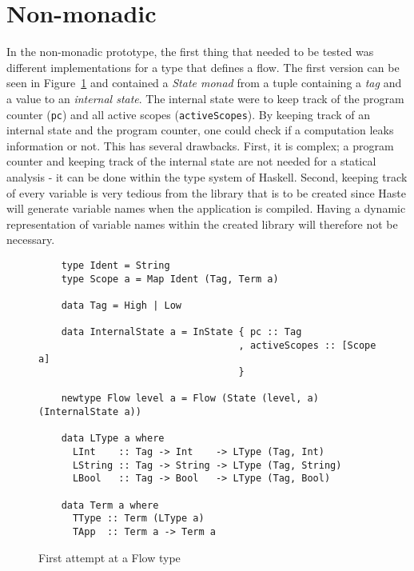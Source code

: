 \section{Non-monadic}
In the non-monadic prototype, the first thing that needed to be tested was different implementations for a type that defines a flow. The first version can be seen in Figure~\ref{fig:first_flow} and contained a \emph{State monad} from a tuple containing a \emph{tag} and a value to an \emph{internal state}. The internal state were to keep track of the program counter ({\tt pc}) and all active scopes ({\tt activeScopes}). By keeping track of an internal state and the program counter, one could check if a computation leaks information or not. This has several drawbacks. First, it is complex; a program counter and keeping track of the internal state are not needed for a statical analysis - it can be done within the type system of Haskell. Second, keeping track of every variable is very tedious from the library that is to be created since Haste will generate variable names when the application is compiled. Having a dynamic representation of variable names within the created library will therefore not be necessary.
\begin{figure}[h]
  \begin{verbatim}
    type Ident = String
    type Scope a = Map Ident (Tag, Term a)

    data Tag = High | Low
    
    data InternalState a = InState { pc :: Tag
                                   , activeScopes :: [Scope a]
                                   }

    newtype Flow level a = Flow (State (level, a) (InternalState a))

    data LType a where
      LInt    :: Tag -> Int    -> LType (Tag, Int)
      LString :: Tag -> String -> LType (Tag, String)
      LBool   :: Tag -> Bool   -> LType (Tag, Bool)

    data Term a where
      TType :: Term (LType a)
      TApp  :: Term a -> Term a

  \end{verbatim}
  \caption{First attempt at a Flow type}
  \label{fig:first_flow}
\end{figure}

